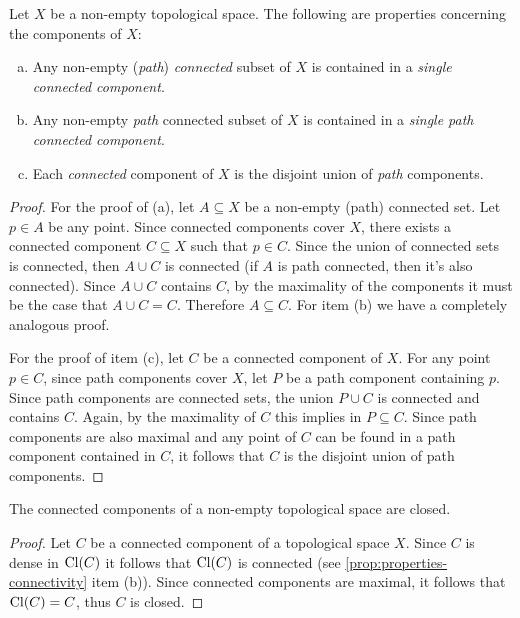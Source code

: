 \begin{corollary}
\label{cor:components-contained-and-unions}
Let \(X\) be a non-empty topological space. The following are properties
concerning the components of \(X\):
\begin{enumerate}[(a)]\setlength\itemsep{0em}
\item Any non-empty (\emph{path}) \emph{connected} subset of \(X\) is contained
  in a \emph{single connected component}.

\item Any non-empty \emph{path} connected subset of \(X\) is contained in a
  \emph{single path connected component}.

\item Each \emph{connected} component of \(X\) is the disjoint union of
  \emph{path} components.
\end{enumerate}
\end{corollary}

\begin{proof}
For the proof of (a), let \(A \subseteq X\) be a non-empty (path) connected
set. Let \(p \in A\) be any point. Since connected components cover \(X\), there
exists a connected component \(C \subseteq X\) such that \(p \in C\). Since the
union of connected sets is connected, then \(A \cup C\) is connected (if \(A\)
is path connected, then it's also connected). Since \(A \cup C\) contains \(C\),
by the maximality of the components it must be the case that \(A \cup C =
C\). Therefore \(A \subseteq C\). For item (b) we have a completely analogous
proof.

For the proof of item (c), let \(C\) be a connected component of \(X\). For any
point \(p \in C\), since path components cover \(X\), let \(P\) be a path
component containing \(p\). Since path components are connected sets, the union
\(P \cup C\) is connected and contains \(C\). Again, by the maximality of \(C\)
this implies in \(P \subseteq C\). Since path components are also maximal and
any point of \(C\) can be found in a path component contained in \(C\), it
follows that \(C\) is the disjoint union of path components.
\end{proof}

\begin{lemma}
\label{lem:conn-comp-are-closed}
The connected components of a non-empty topological space are closed.
\end{lemma}

\begin{proof}
Let \(C\) be a connected component of a topological space \(X\). Since \(C\) is
dense in \(\operatorname{Cl}(C)\) it follows that \(\operatorname{Cl}(C)\) is connected (see
\cref{prop:properties-connectivity} item (b)). Since connected components are
maximal, it follows that \(\operatorname{Cl}(C) = C\), thus \(C\) is closed.
\end{proof}


